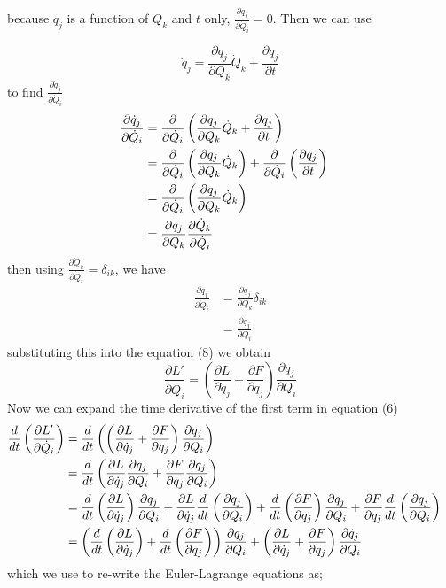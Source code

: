 \documentclass{article}
\begin{document}
because $q_j$ is a function of $Q_k$ and $t$ only, $\frac{\partial q_j}{\partial \dot{Q}_i} = 0$. Then we can use

\[
	\dot q_j = \frac{\partial q_j}{\partial Q_k}\dot Q_k + \frac{\partial q_j}{\partial t}
\]
to find $\frac{\partial \dot{q}_j}{\partial \dot{Q}_i}$
\begin{align*}
	\frac{\partial \dot{q}_j}{\partial \dot{Q}_i} &= \frac{\partial}{\partial \dot{Q}_i}\left(\frac{\partial q_j}{\partial Q_k}\dot Q_k + \frac{\partial q_j}{\partial t}\right) \cr
	&= \frac{\partial}{\partial \dot{Q}_i}\left(\frac{\partial q_j}{\partial Q_k}\dot Q_k\right) + \frac{\partial}{\partial \dot{Q}_i}\left(\frac{\partial q_j}{\partial t}\right) \cr
	&= \frac{\partial}{\partial \dot{Q}_i}\left(\frac{\partial q_j}{\partial Q_k}\dot Q_k\right) \cr
	&= \frac{\partial q_j}{\partial Q_k}\frac{\partial \dot Q_k}{\partial \dot{Q}_i}
\end{align*}
then using $\frac{\partial \dot Q_k}{\partial \dot{Q}_i} = \delta_{ik}$, we have
\begin{align*}
	\frac{\partial \dot{q}_j}{\partial \dot{Q}_i} &= \frac{\partial q_j}{\partial Q_k} \delta_{ik} \\
	&= \frac{\partial q_j}{\partial Q_i}
\end{align*}
substituting this into the equation (8) we obtain
\begin{equation}
	\frac{\partial L'}{\partial \dot{Q}_i} = \left(\frac{\partial L}{\partial \dot{q}_j}  + \frac{\partial F}{\partial q_j}\right) \frac{\partial q_j}{\partial Q_i}
\end{equation}
Now we can expand the time derivative of the first term in equation (6)
\begin{align}
	\frac{d}{dt} \left( \frac{\partial L'}{\partial \dot{Q}_i} \right) &= \frac{d}{dt} \left( \left(\frac{\partial L}{\partial \dot{q}_j}  + \frac{\partial F}{\partial q_j}\right) \frac{\partial q_j}{\partial Q_i} \right) \cr
	&= \frac{d}{dt} \left( \frac{\partial L}{\partial \dot{q}_j} \frac{\partial q_j}{\partial Q_i} + \frac{\partial F}{\partial q_j} \frac{\partial q_j}{\partial Q_i} \right) \cr
	&= \frac{d}{dt} \left( \frac{\partial L}{\partial \dot{q}_j} \right) \frac{\partial q_j}{\partial Q_i} + \frac{\partial L}{\partial \dot{q}_j} \frac{d}{dt} \left( \frac{\partial q_j}{\partial Q_i} \right) + \frac{d}{dt} \left( \frac{\partial F}{\partial q_j} \right) \frac{\partial q_j}{\partial Q_i} + \frac{\partial F}{\partial q_j} \frac{d}{dt} \left( \frac{\partial q_j}{\partial Q_i} \right) \cr
	&= \left(\frac{d}{dt} \left( \frac{\partial L}{\partial \dot{q}_j} \right) + \frac{d}{dt} \left( \frac{\partial F}{\partial q_j} \right)\right) \frac{\partial q_j}{\partial Q_i} + \left(\frac{\partial L}{\partial \dot{q}_j} + \frac{\partial F}{\partial q_j}\right) \frac{\partial \dot{q}_j}{\partial Q_i}
\end{align}
which we use to re-write the Euler-Lagrange equations as;
\end{document}
